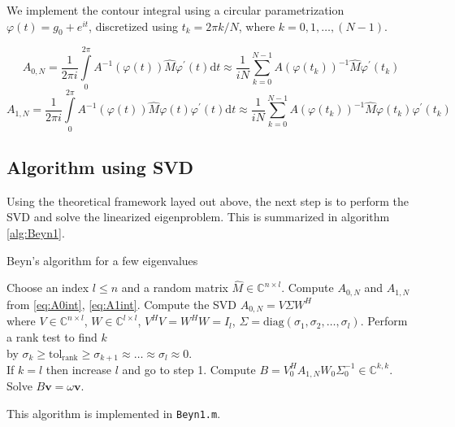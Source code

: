 \documentclass[final,leqno,onefignum,onetabnum]{siamltex1213}
\newcommand{\diff}{\mathrm{d}}
\begin{document}
We implement the contour integral using a circular parametrization $\varphi(t) = g_0 + e^{i t}$, discretized using $t_k = 2\pi k/N$, where $k=0,1,\ldots,(N-1)$. 

\begin{equation}\label{eq:A0int}
A_{0,N} = \frac{1}{2\pi i}\int\limits_{0}^{2\pi} A^{-1}(\varphi(t))\hat{M} \varphi^{\prime}(t)\diff t 
\approx \frac{1}{iN}\sum\limits_{k=0}^{N-1}A(\varphi(t_k))^{-1}\hat{M}\varphi^{\prime}(t_k)
\end{equation}
\begin{equation}\label{eq:A1int}
A_{1,N} = \frac{1}{2\pi i}\int\limits_{0}^{2\pi} A^{-1}(\varphi(t))\hat{M} \varphi(t) \varphi^{\prime}(t)\diff t
\approx \frac{1}{iN}\sum\limits_{k=0}^{N-1}A(\varphi(t_k))^{-1}\hat{M} \varphi(t_k) \varphi^{\prime}(t_k)
\end{equation}

\subsection{Algorithm using SVD}
Using the theoretical framework layed out above, the next step is to perform the SVD and solve the linearized eigenproblem. This is summarized in algorithm \ref{alg:Beyn1}. 

\begin{algorithm}
\caption{Beyn's algorithm for a few eigenvalues}
\label{alg:Beyn1}
\begin{algorithmic}
\REQUIRE Choose an index $l\leq n$ and a random matrix $\hat{M}\in\mathbb{C}^{n\times l}$. 
\STATE Compute $A_{0,N}$ and $A_{1,N}$ from \ref{eq:A0int}, \ref{eq:A1int}. 
\STATE Compute the SVD $A_{0,N} = V\Sigma W^{H}$ 
\\ \hspace{0.5cm} where $V\in\mathbb{C}^{n\times l}$, $W\in\mathbb{C}^{l\times l}$, $V^{H}V=W^{H}W = I_{l}$, $\Sigma = \mathrm{diag}(\sigma_1,\sigma_2,\ldots,\sigma_l)$.
\STATE Perform a rank test to find $k$ 
\\ \hspace{0.5cm} by $\sigma_k \geq \mathrm{tol_{rank}}\geq \sigma_{k+1} \approx \ldots \approx \sigma_l \approx 0$. 
\\ \hspace{0.5cm} If $k = l$ then increase $l$ and go to step 1. 
\STATE Compute $B = V_0^H A_{1,N} W_0 \Sigma_0^{-1} \in \mathbb{C}^{k,k}$.
\STATE Solve $B\mathbf{v} =\omega\mathbf{v}$.
\end{algorithmic}
\end{algorithm}
This algorithm is implemented in {\tt Beyn1.m}. 
\end{document}

